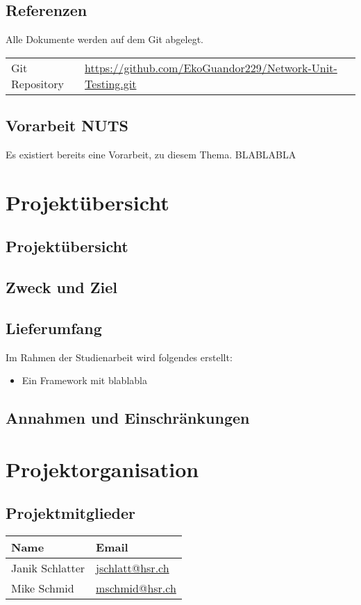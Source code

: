 \documentclass[
	ngerman,
	toc=listof, %
	toc=bibliography, %
	footnotes=multiple, %
	parskip=half, %
	numbers=noendperiod %
]{scrartcl}
\begin{document}
	\subsection{Referenzen}
		Alle Dokumente werden auf dem Git abgelegt.

	\begin{tabularx}{\textwidth}{lX}
		Git Repository & \url{https://github.com/EkoGuandor229/Network-Unit-Testing.git} \\
	\end{tabularx}

	\subsection{Vorarbeit NUTS}
		Es existiert bereits eine Vorarbeit, zu diesem Thema. BLABLABLA

\section{Projektübersicht}

	\subsection{Projektübersicht}

	\subsection{Zweck und Ziel}

	\subsection{Lieferumfang}
		Im Rahmen der Studienarbeit wird folgendes erstellt:
		\begin{itemize}
			\item Ein Framework mit blablabla
		\end{itemize}
	\subsection{Annahmen und Einschränkungen}

\section{Projektorganisation}

	\subsection{Projektmitglieder}
		\begin{tabularx}{0.9\textwidth}{lX}
			\toprule
			Name & Email \\
			\midrule
			Janik Schlatter & \url{jschlatt@hsr.ch} \\
			Mike Schmid & \url{mschmid@hsr.ch} \\
			\bottomrule
		\end{tabularx}
\end{document}
